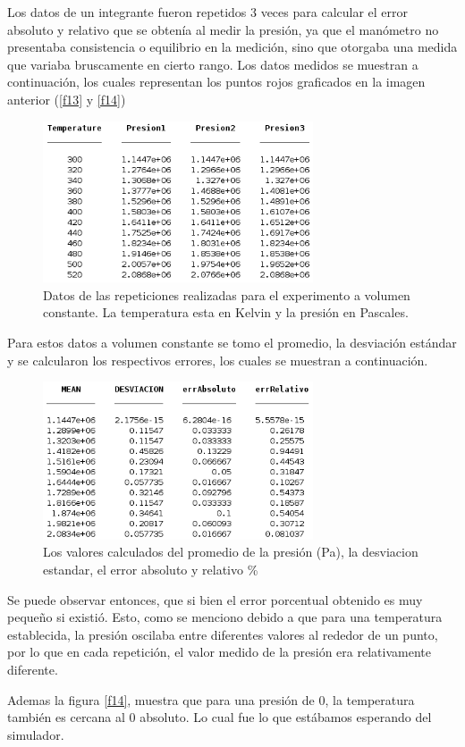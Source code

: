 \documentclass[journal,transmag]{IEEEtran}
\begin{document}
Los datos de un integrante fueron repetidos 3 veces para calcular el error absoluto y relativo que se obtenía al medir la presión, ya que el manómetro no presentaba consistencia o equilibrio en la medición, sino que otorgaba una medida que variaba bruscamente en cierto rango. Los datos medidos se muestran a continuación, los cuales representan los puntos rojos graficados en la imagen anterior (\ref{f13} y \ref{f14})
\begin{figure}[!h]
				\center
				\includegraphics[width=8cm]{img/t1.png}
				\caption{Datos de las repeticiones realizadas para el experimento a volumen constante. La temperatura esta en Kelvin y la presión en Pascales.}
				\label{f15}
	\end{figure}
Para estos datos a volumen constante se tomo el promedio, la desviación estándar y se calcularon los respectivos errores, los cuales se muestran a continuación.
\begin{figure}[!h]
				\center
				\includegraphics[width=8cm]{img/t2.png}
				\caption{Los valores calculados del promedio de la presión (Pa), la desviacion estandar, el error absoluto y relativo \% }
				\label{f16}
	\end{figure}
	
Se puede observar entonces, que si bien el error porcentual obtenido es muy pequeño si existió. Esto, como se menciono debido a que para una temperatura establecida, la presión oscilaba entre diferentes valores al rededor de un punto, por lo que en cada repetición, el valor medido de la presión era relativamente diferente.

Ademas la figura \ref{f14}, muestra que para una presión de 0, la temperatura también es cercana al 0 absoluto. Lo cual fue lo que estábamos esperando del simulador.
\end{document}
